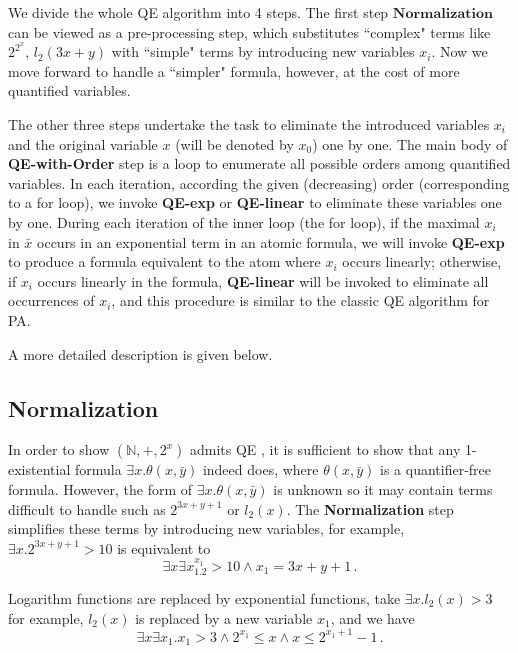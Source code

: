 \documentclass[runningheads]{llncs}
\begin{document}
We divide the whole QE algorithm into 4 steps.
The first step $\textbf{Normalization}$ can be viewed as a pre-processing step, which substitutes ``complex" terms like $2^{2^x}$, $l_2(3x+y)$ with ``simple" terms by introducing new variables $x_i$. Now we move forward to handle a ``simpler" formula, however, at the cost of more quantified variables.

The other three steps undertake the task to eliminate the introduced variables $x_i$ and the original variable $x$ (will be denoted by $x_0$) one by one. 
The main body of \textbf{QE-with-Order} step is a loop to enumerate all possible orders among quantified variables. 
In each iteration, according the given (decreasing) order (corresponding to a for loop), we invoke \textbf{QE-exp} or 
\textbf{QE-linear} to eliminate these variables one by one. 
During each iteration of the inner loop (the for loop), 
if the maximal $x_i$ in $\bar{x}$ occurs in an exponential term in an atomic formula, 
we will invoke \textbf{QE-exp} to produce a formula equivalent to the atom where $x_i$ occurs linearly;  
otherwise, if $x_i$ occurs linearly in the formula, \textbf{QE-linear} will be invoked to eliminate all occurrences of $x_i$, 
and this procedure is similar to the classic QE algorithm for PA. 

A more detailed description is given below.

\subsection{Normalization}

In order to show $(\mathbb{N},+,2^x)$ admits QE , 
it is sufficient to show that any 1-existential formula $\exists x.\theta(x,\bar{y})$ indeed does, 
where $\theta(x,\bar{y})$ is a quantifier-free formula. 
However, the form of $\exists x.\theta(x,\bar{y})$ is unknown so it may contain terms difficult to handle such as $2^{3x+y+1}$ or $l_2(x)$.
The \textbf{Normalization} step simplifies these terms by introducing new variables, 
for example, $\exists x.2^{3x+y+1}>10$ is equivalent to
$$\exists x\exists x_1.2^{x_1}>10 \wedge x_1 =3x+y+1\,.$$

Logarithm functions are replaced by exponential functions, take $\exists x.l_2(x)>3$ for example, $l_2(x)$ is replaced by a new variable $x_1$, and we have  
$$\exists x\exists x_1. x_1 > 3 \wedge 2^{x_1}\le x \wedge x\le 2^{x_1+1}-1\,.$$
\end{document}
